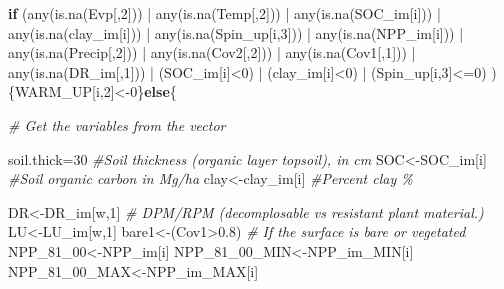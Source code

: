 \documentclass[
  10pt,
  b5paper,
]{book}
\newenvironment{Shaded}{\begin{snugshade}}{\end{snugshade}}
\newcommand{\CommentTok}[1]{\textcolor[rgb]{0.56,0.35,0.01}{\textit{#1}}}
\newcommand{\ControlFlowTok}[1]{\textcolor[rgb]{0.13,0.29,0.53}{\textbf{#1}}}
\newcommand{\DecValTok}[1]{\textcolor[rgb]{0.00,0.00,0.81}{#1}}
\newcommand{\FloatTok}[1]{\textcolor[rgb]{0.00,0.00,0.81}{#1}}
\newcommand{\FunctionTok}[1]{\textcolor[rgb]{0.00,0.00,0.00}{#1}}
\newcommand{\NormalTok}[1]{#1}
\newcommand{\OtherTok}[1]{\textcolor[rgb]{0.56,0.35,0.01}{#1}}
\newcommand{\SpecialCharTok}[1]{\textcolor[rgb]{0.00,0.00,0.00}{#1}}
\begin{document}
\begin{Shaded}
\begin{Highlighting}[]
\ControlFlowTok{if}\NormalTok{ (}\FunctionTok{any}\NormalTok{(}\FunctionTok{is.na}\NormalTok{(Evp[,}\DecValTok{2}\NormalTok{])) }\SpecialCharTok{|} \FunctionTok{any}\NormalTok{(}\FunctionTok{is.na}\NormalTok{(Temp[,}\DecValTok{2}\NormalTok{])) }\SpecialCharTok{|} \FunctionTok{any}\NormalTok{(}\FunctionTok{is.na}\NormalTok{(SOC\_im[i])) }\SpecialCharTok{|} \FunctionTok{any}\NormalTok{(}\FunctionTok{is.na}\NormalTok{(clay\_im[i])) }\SpecialCharTok{|} \FunctionTok{any}\NormalTok{(}\FunctionTok{is.na}\NormalTok{(Spin\_up[i,}\DecValTok{3}\NormalTok{]))  }\SpecialCharTok{|} \FunctionTok{any}\NormalTok{(}\FunctionTok{is.na}\NormalTok{(NPP\_im[i])) }\SpecialCharTok{|} \FunctionTok{any}\NormalTok{(}\FunctionTok{is.na}\NormalTok{(Precip[,}\DecValTok{2}\NormalTok{]))  }\SpecialCharTok{|}  \FunctionTok{any}\NormalTok{(}\FunctionTok{is.na}\NormalTok{(Cov2[,}\DecValTok{2}\NormalTok{]))  }\SpecialCharTok{|}  \FunctionTok{any}\NormalTok{(}\FunctionTok{is.na}\NormalTok{(Cov1[,}\DecValTok{1}\NormalTok{]))  }\SpecialCharTok{|} \FunctionTok{any}\NormalTok{(}\FunctionTok{is.na}\NormalTok{(DR\_im[,}\DecValTok{1}\NormalTok{]))    }\SpecialCharTok{|}\NormalTok{  (SOC\_im[i]}\SpecialCharTok{\textless{}}\DecValTok{0}\NormalTok{) }\SpecialCharTok{|}\NormalTok{ (clay\_im[i]}\SpecialCharTok{\textless{}}\DecValTok{0}\NormalTok{) }\SpecialCharTok{|}\NormalTok{ (Spin\_up[i,}\DecValTok{3}\NormalTok{]}\SpecialCharTok{\textless{}=}\DecValTok{0}\NormalTok{) ) \{WARM\_UP[i,}\DecValTok{2}\NormalTok{]}\OtherTok{\textless{}{-}}\DecValTok{0}\NormalTok{\}}\ControlFlowTok{else}\NormalTok{\{}

\CommentTok{\# Get the variables from the vector}

\NormalTok{soil.thick}\OtherTok{=}\DecValTok{30}  \CommentTok{\#Soil thickness (organic layer topsoil), in cm}
\NormalTok{SOC}\OtherTok{\textless{}{-}}\NormalTok{SOC\_im[i]      }\CommentTok{\#Soil organic carbon in Mg/ha }
\NormalTok{clay}\OtherTok{\textless{}{-}}\NormalTok{clay\_im[i]        }\CommentTok{\#Percent clay \%}

\NormalTok{DR}\OtherTok{\textless{}{-}}\NormalTok{DR\_im[w,}\DecValTok{1}\NormalTok{]              }\CommentTok{\# DPM/RPM (decomplosable vs resistant plant material.)}
\NormalTok{LU}\OtherTok{\textless{}{-}}\NormalTok{LU\_im[w,}\DecValTok{1}\NormalTok{] }
\NormalTok{bare1}\OtherTok{\textless{}{-}}\NormalTok{(Cov1}\SpecialCharTok{\textgreater{}}\FloatTok{0.8}\NormalTok{)           }\CommentTok{\# If the surface is bare or vegetated}
\NormalTok{NPP\_81\_00}\OtherTok{\textless{}{-}}\NormalTok{NPP\_im[i]}
\NormalTok{NPP\_81\_00\_MIN}\OtherTok{\textless{}{-}}\NormalTok{NPP\_im\_MIN[i]}
\NormalTok{NPP\_81\_00\_MAX}\OtherTok{\textless{}{-}}\NormalTok{NPP\_im\_MAX[i]}


\end{Highlighting}
\end{Shaded}
\end{document}
